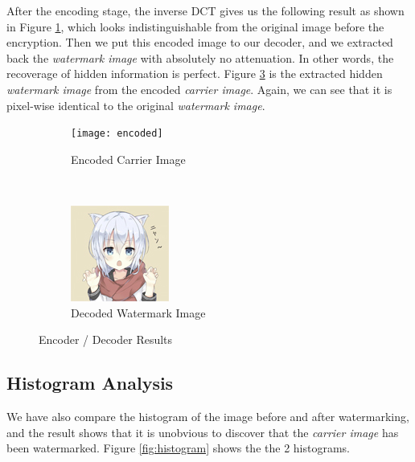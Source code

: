 \documentclass{article}
\begin{document}
After the encoding stage, the inverse DCT gives us the following result as shown
in Figure \ref{fig:starry_encoded}, which looks indistinguishable from the
original image before the encryption. Then we put this encoded image to our decoder,
and we extracted back the \textit{watermark image} with absolutely no attenuation.
In other words, the recoverage of hidden information is perfect. Figure
\ref{fig:decoded_small} is the extracted hidden \textit{watermark image} from the encoded
\textit{carrier image}. Again, we can see that it is pixel-wise identical to the
original \textit{watermark image}.

\begin{figure}[h]
    \centering
    \begin{subfigure}[t]{0.6\textwidth}
        \texttt{[image: encoded]}
        \caption{Encoded Carrier Image}
        \label{fig:starry_encoded}
    \end{subfigure}
    ~
    \begin{subfigure}[t]{0.35\textwidth}
        \includegraphics[width=\textwidth]{decoded}
        \caption{Decoded Watermark Image}
        \label{fig:decoded_small}
    \end{subfigure}
    \caption{Encoder / Decoder Results}
\end{figure}

\subsection{Histogram Analysis}
We have also compare the histogram of the image before and after watermarking,
and the result shows that it is unobvious to discover that the \textit{carrier image}
has been watermarked. Figure \ref{fig:histogram} shows the the 2 histograms.
\end{document}
